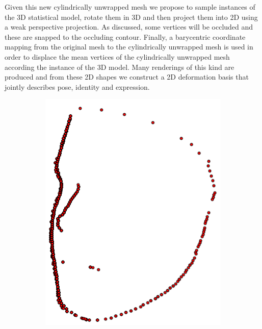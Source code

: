 Given this new cylindrically unwrapped mesh we propose to sample
instances of the 3D statistical model, rotate them in 3D and then project them
into 2D using a weak perspective projection. As discussed, some vertices
will be occluded and these are snapped to the occluding contour. Finally, a
barycentric coordinate mapping from the original mesh to the cylindrically
unwrapped mesh is used in order to displace the mean vertices of the cylindrically
unwrapped mesh according the instance of the 3D model. Many renderings of this
kind are produced and from these 2D shapes we construct a 2D deformation basis
that jointly describes pose, identity and expression.
\begin{figure}[t]
    \centering
    \hspace*{\fill}
    \begin{subfigure}[b]{0.23\textwidth}
        \centering
        \includegraphics[width=\textwidth]{face_flow/images/contour_snapping/posed_snapped_contour}

\end{subfigure}
\end{figure}
